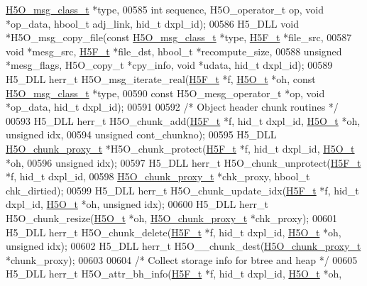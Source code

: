 \begin{DoxyCode}
      \hyperlink{struct_h5_o__msg__class__t}{H5O\_msg\_class\_t} *type,
00585     \textcolor{keywordtype}{int} sequence, H5O\_operator\_t op, \textcolor{keywordtype}{void} *op\_data, hbool\_t adj\_link, hid\_t dxpl\_id);
00586 H5\_DLL \textcolor{keywordtype}{void} *H5O\_msg\_copy\_file(\textcolor{keyword}{const} \hyperlink{struct_h5_o__msg__class__t}{H5O\_msg\_class\_t} *type, \hyperlink{struct_h5_f__t}{H5F\_t} *file\_src,
00587     \textcolor{keywordtype}{void} *mesg\_src, \hyperlink{struct_h5_f__t}{H5F\_t} *file\_dst, hbool\_t *recompute\_size,
00588     \textcolor{keywordtype}{unsigned} *mesg\_flags, H5O\_copy\_t *cpy\_info, \textcolor{keywordtype}{void} *udata, hid\_t dxpl\_id);
00589 H5\_DLL herr\_t H5O\_msg\_iterate\_real(\hyperlink{struct_h5_f__t}{H5F\_t} *f, \hyperlink{struct_h5_o__t}{H5O\_t} *oh, \textcolor{keyword}{const} 
      \hyperlink{struct_h5_o__msg__class__t}{H5O\_msg\_class\_t} *type,
00590     \textcolor{keyword}{const} H5O\_mesg\_operator\_t *op, \textcolor{keywordtype}{void} *op\_data, hid\_t dxpl\_id);
00591 
00592 \textcolor{comment}{/* Object header chunk routines */}
00593 H5\_DLL herr\_t H5O\_chunk\_add(\hyperlink{struct_h5_f__t}{H5F\_t} *f, hid\_t dxpl\_id, \hyperlink{struct_h5_o__t}{H5O\_t} *oh, \textcolor{keywordtype}{unsigned} idx,
00594     \textcolor{keywordtype}{unsigned} cont\_chunkno);
00595 H5\_DLL \hyperlink{struct_h5_o__chunk__proxy__t}{H5O\_chunk\_proxy\_t} *H5O\_chunk\_protect(\hyperlink{struct_h5_f__t}{H5F\_t} *f, hid\_t dxpl\_id, 
      \hyperlink{struct_h5_o__t}{H5O\_t} *oh,
00596     \textcolor{keywordtype}{unsigned} idx);
00597 H5\_DLL herr\_t H5O\_chunk\_unprotect(\hyperlink{struct_h5_f__t}{H5F\_t} *f, hid\_t dxpl\_id,
00598     \hyperlink{struct_h5_o__chunk__proxy__t}{H5O\_chunk\_proxy\_t} *chk\_proxy, hbool\_t chk\_dirtied);
00599 H5\_DLL herr\_t H5O\_chunk\_update\_idx(\hyperlink{struct_h5_f__t}{H5F\_t} *f, hid\_t dxpl\_id, \hyperlink{struct_h5_o__t}{H5O\_t} *oh, \textcolor{keywordtype}{unsigned} idx);
00600 H5\_DLL herr\_t H5O\_chunk\_resize(\hyperlink{struct_h5_o__t}{H5O\_t} *oh, \hyperlink{struct_h5_o__chunk__proxy__t}{H5O\_chunk\_proxy\_t} *chk\_proxy);
00601 H5\_DLL herr\_t H5O\_chunk\_delete(\hyperlink{struct_h5_f__t}{H5F\_t} *f, hid\_t dxpl\_id, \hyperlink{struct_h5_o__t}{H5O\_t} *oh, \textcolor{keywordtype}{unsigned} idx);
00602 H5\_DLL herr\_t H5O\_\_chunk\_dest(\hyperlink{struct_h5_o__chunk__proxy__t}{H5O\_chunk\_proxy\_t} *chunk\_proxy);
00603 
00604 \textcolor{comment}{/* Collect storage info for btree and heap */}
00605 H5\_DLL herr\_t H5O\_attr\_bh\_info(\hyperlink{struct_h5_f__t}{H5F\_t} *f, hid\_t dxpl\_id, \hyperlink{struct_h5_o__t}{H5O\_t} *oh,

\end{DoxyCode}
